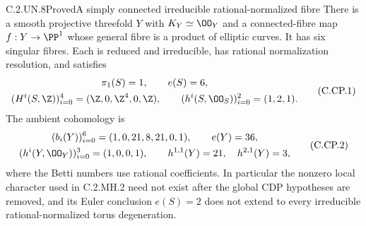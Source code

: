 \begin{statement}{C.2.UN.8}{Proved}{A simply connected irreducible rational-normalized fibre}
There is a smooth projective threefold $Y$ with $K_Y\simeq\OO_Y$
and a connected-fibre map $f:Y\to\PP^1$ whose general fibre is a
product of elliptic curves. It has six singular fibres. Each is
reduced and irreducible, has rational normalization resolution, and
satisfies
\[
 \begin{gathered}
 \pi_1(S)=1,\qquad e(S)=6,\\
 (H^i(S,\Z))_{i=0}^4=(\Z,0,\Z^4,0,\Z),\qquad
 (h^i(S,\OO_S))_{i=0}^2=(1,2,1).
 \end{gathered}
 \tag{C.CP.1}
\]
The ambient cohomology is
\[
 \begin{gathered}
 (b_i(Y))_{i=0}^6=(1,0,21,8,21,0,1),\qquad e(Y)=36,\\
 (h^i(Y,\OO_Y))_{i=0}^3=(1,0,0,1),\qquad
 h^{1,1}(Y)=21,\quad h^{2,1}(Y)=3,
 \end{gathered}
 \tag{C.CP.2}
\]
where the Betti numbers use rational coefficients. In particular
the nonzero local character used in C.2.MH.2 need not exist after
the global CDP hypotheses are removed, and its Euler conclusion
$e(S)=2$ does not extend to every irreducible rational-normalized
torus degeneration.
\end{statement}
